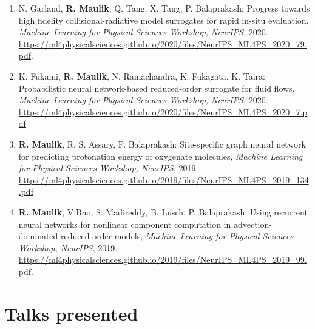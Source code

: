 \documentclass[letterpaper]{article}
\begin{document}
\begin{enumerate}
\item N. Garland, \textbf{R. Maulik}, Q. Tang, X. Tang, P. Balaprakash: Progress towards high fidelity collisional-radiative model surrogates for rapid in-situ evaluation, \textit{Machine Learning for Physical Sciences Workshop, NeurIPS}, 2020. \url{https://ml4physicalsciences.github.io/2020/files/NeurIPS_ML4PS_2020_79.pdf}.

\item K. Fukami, \textbf{R. Maulik}, N. Ramachandra, K. Fukagata, K. Taira: Probabilistic neural network-based reduced-order surrogate for fluid flows, \textit{Machine Learning for Physical Sciences Workshop, NeurIPS}, 2020. \url{https://ml4physicalsciences.github.io/2020/files/NeurIPS_ML4PS_2020_7.pdf}

\item \textbf{R. Maulik}, R. S. Assary, P. Balaprakash: Site-specific graph neural network for predicting protonation energy of oxygenate molecules, {\it Machine Learning for Physical Sciences Workshop, NeurIPS}, 2019. \url{https://ml4physicalsciences.github.io/2019/files/NeurIPS_ML4PS_2019_134.pdf}

\item \textbf{R. Maulik}, V.Rao, S. Madireddy, B. Lusch, P. Balaprakash: Using recurrent neural networks for nonlinear component computation in advection-dominated reduced-order models, \textit{Machine Learning for Physical Sciences Workshop, NeurIPS}, 2019. \url{https://ml4physicalsciences.github.io/2019/files/NeurIPS_ML4PS_2019_99.pdf}.

\end{enumerate}



\section*{Talks presented}
\end{document}

